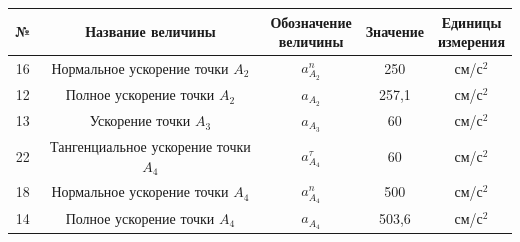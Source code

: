 \documentclass{article}
\begin{document}
\begin{tabular}{|c|c|c|c|c|}
  \hline
  \rule{0pt}{1cm} № & \hspace*{0.5cm} Название величины \hspace*{0.5cm} & \makecell{Обозначение\\ величины} & Значение & \makecell{Единицы\\ измерения} \\[0.5cm]
  \hline
  \rule{0pt}{1cm} 16 & \makecell{Нормальное\\ускорение точки $A_2$} & $a_{A_2}^n$ & 250 & см/с$^2$ \\[0.5cm]
  \hline
  \rule{0pt}{1cm} 12 & \makecell{Полное ускорение\\точки $A_2$} & $a_{A_2}$ & 257,1 & см/с$^2$ \\[0.5cm]
  \hline
  \rule{0pt}{1cm} 13 & \makecell{Ускорение\\точки $A_3$} & $a_{A_3}$ & 60 & см/с$^2$ \\[0.5cm]
  \hline
  \rule{0pt}{1cm} 22 & \makecell{Тангенциальное\\ускорение точки $A_4$} & $a_{A_4}^\tau$ & 60 & см/с$^2$ \\[0.5cm]
  \hline
  \rule{0pt}{1cm} 18 & \makecell{Нормальное\\ускорение точки $A_4$} & $a_{A_4}^n$ & 500 & см/с$^2$ \\[0.5cm]
  \hline
  \rule{0pt}{1cm} 14 & \makecell{Полное ускорение\\точки $A_4$} & $a_{A_4}$ & 503,6 & см/с$^2$ \\[0.5cm]
  \hline
\end{tabular}
\end{document}
